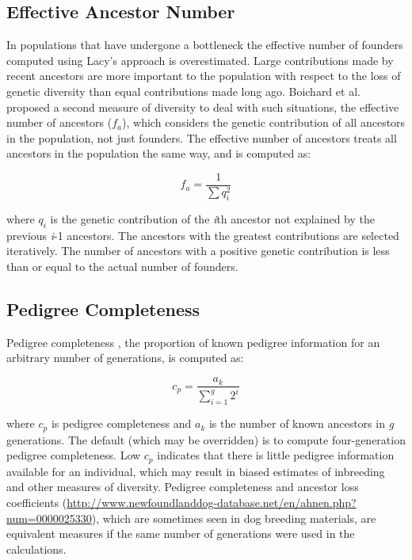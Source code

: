 \subsection{Effective Ancestor Number}
\label{sec:methodology-computation-effective-ancestor-number}
In populations that have undergone a bottleneck the effective number of founders computed using Lacy's \citeyear{ref640} approach is overestimated. Large contributions made by recent ancestors are more important to the population with respect to the loss of genetic diversity than equal contributions made long ago. Boichard et al. \citeyear{ref352} proposed a second measure of diversity to deal with such situations, the effective number of ancestors ($f_a$), which considers the genetic contribution of all ancestors in the population, not just founders. The effective number of ancestors treats all ancestors in the population the same way, and is computed as:

\[f_a = \dfrac{1}{\sum{q_i^2}}\]

where $q_i$ is the genetic contribution of the \textit{i}th ancestor not explained by the previous \textit{i}-1 ancestors.
The ancestors with the greatest contributions are selected iteratively.  The number of ancestors with a positive genetic
contribution is less than or equal to the actual number of founders.
\subsection{Pedigree Completeness}
\label{sec:methodology-pedigre-completeness}
Pedigree completeness \cite{Cassell2003a}, the proportion of known pedigree information for an arbitrary number of generations, is computed as:

\[ c_p = \dfrac{a_k}{\sum_{i=1}^g{2^i}} \]

where $c_p$ is pedigree completeness and $a_k$ is the number of known ancestors in \textit{g} generations.  The default (which may be overridden) is to compute four-generation pedigree completeness.  Low $c_p$ indicates that there is little pedigree information available for an individual, which may result in biased estimates of inbreeding and other measures of diversity. Pedigree completeness and ancestor loss coefficients (\url{http://www.newfoundlanddog-database.net/en/ahnen.php?num=0000025330}), which are sometimes seen in dog breeding materials, are equivalent measures if the same number of generations were used in the calculations.